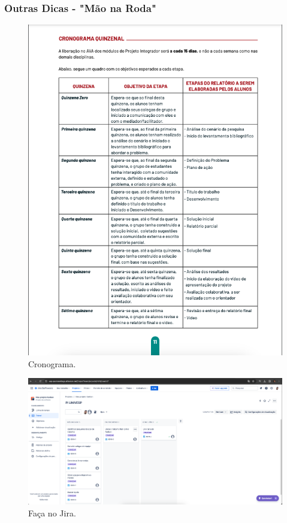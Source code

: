 \documentclass{beamer}
\begin{document}
\begin{frame}
  \frametitle{Outras Dicas - "Mão na Roda"}
  \begin{minipage}{0.48\textwidth}
    \centering
    \begin{figure}
      \includegraphics[width=\textwidth]{cronograma.png}
      \captionsetup{labelformat=simple, labelsep=period}
      \caption{Cronograma.}
    \end{figure}
  \end{minipage}
  \hfill
  \begin{minipage}{0.48\textwidth}
    \centering
    \begin{figure}
      \includegraphics[width=\textwidth]{jira.png}
      \captionsetup{labelformat=simple, labelsep=period}
      \caption{Faça no Jira.}
    \end{figure}
  \end{minipage}
\end{frame}
\end{document}
